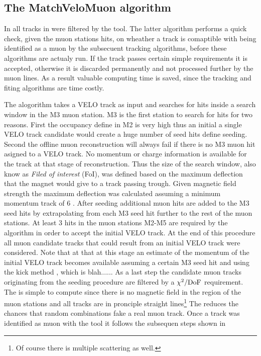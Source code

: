 \subsection{The MatchVeloMuon algorithm}
\label{sec:muon_matching}

In \runone all \velo tracks in \hltone were filtered by the \mvm tool. The latter algorithm performs a quick check,
given the muon stations hits, on wheather a \velo track is comaptible with being identified as a muon by the subsecuent
tracking algorithms, before these algorithms are actualy run. If the \velo track passes certain simple requirements it
is accepted, otherwise it is discarded permanently and not processed further by the \hltone muon lines. As a result
valuable computing time is saved, since the \FwD tracking and fiting algorithms are time costly.

The \mvm alogorithm takes a VELO track as input and searches for hits inside a search window in the M3 muon station.
M3 is the first station to search for hits for two reasons.
First the occupancy{\color{red} define} in M2 is very high thus an initial a single VELO track candidate would create
a huge number of seed hits{\color{red} define seeding}. Second the offline muon reconstruction will always fail if
there is no M3 muon hit asigned to a VELO track.
No momentum or charge information is available for the \velo track at that stage of reconstruction. Thus the size of the search window,
also know as {\it Filed of interest} (FoI),
was defined based on the maximum deflection that the \lhcb magnet would give to a track passing trough.
Given \lhcb magnetic field strength the maximum deflection was calculated assuming
a minimum momentum track of 6 \gevc. After seeding additional muon hits are added to the M3 seed hits
by extrapolating from each M3 seed hit further to the rest of the muon stations.
At least 3 hits in the muon stations M2-M5 are required by the algorithm in order to accept the initial VELO track.
At the end of this procedure all muon candidate tracks that could result from an initial VELO track were considered.
Note that at that at this stage an estimate of the momentum of the initial VELO track becomes available assuming
a certain M3 seed hit and using the kick method \cite{roelThesis}, which is blah......
As a last step the candidate muon tracks originating from the seeding procedure are filtered by a $\chi^2/{\rm DoF}$
requirement. The \chisq is simple to compute since there is no magnetic field in the region of the muon stations
and all tracks are in pronciple straight lines\footnote{Of course there is multiple scattering as well.}
The \chisq reduces the chances that random combinations fake a real muon track.
Once a track was identified as muon with the \mvm tool it follows the subsequen steps shown in \figref{}

